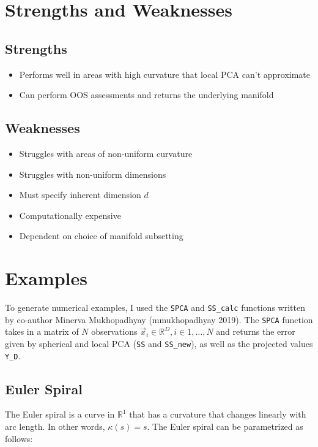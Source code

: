 \documentclass[]{article}
\providecommand{\tightlist}{%
  \setlength{\itemsep}{0pt}\setlength{\parskip}{0pt}}
\begin{document}
\section{Strengths and Weaknesses}

\subsection{Strengths}

\begin{itemize}
\tightlist
\item
  Performs well in areas with high curvature that local PCA can't
  approximate
\item
  Can perform OOS assessments and returns the underlying manifold
\end{itemize}

\subsection{Weaknesses}

\begin{itemize}
\tightlist
\item
  Struggles with areas of non-uniform curvature
\item
  Struggles with non-uniform dimensions
\item
  Must specify inherent dimension \(d\)
\item
  Computationally expensive
\item
  Dependent on choice of manifold subsetting
\end{itemize}

\section{Examples}

To generate numerical examples, I used the \texttt{SPCA} and
\texttt{SS\_calc} functions written by co-author Minerva Mukhopadhyay
(mmukhopadhyay 2019). The \texttt{SPCA} function takes in a matrix of
\(N\) observations \(\vec{x}_i \in \mathbb{R}^{D}, i \in 1, \dots, N\)
and returns the error given by spherical and local PCA (\texttt{SS} and
\texttt{SS\_new}), as well as the projected values \texttt{Y\_D}.

\subsection{Euler Spiral}

The Euler spiral is a curve in \(\mathbb{R}^1\) that has a curvature
that changes linearly with arc length. In other words,
\(\kappa(s) = s\). The Euler spiral can be parametrized as follows:
\end{document}

